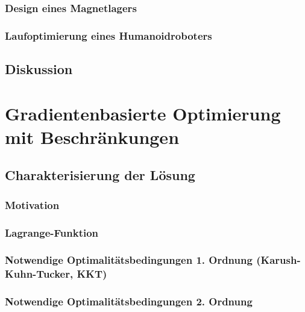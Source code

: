         \subsection{Design eines Magnetlagers} %

        \subsection{Laufoptimierung eines Humanoidroboters} %

    \section{Diskussion} %

\chapter{Gradientenbasierte Optimierung mit Beschränkungen} %

    \section{Charakterisierung der Lösung} %

        \subsection{Motivation} %

        \subsection{Lagrange-Funktion} %

        \subsection{Notwendige Optimalitätsbedingungen 1. Ordnung (Karush-Kuhn-Tucker, KKT)} %

        \subsection{Notwendige Optimalitätsbedingungen 2. Ordnung} %

